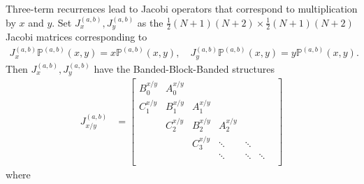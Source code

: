 \documentclass[11pt, oneside]{article}   	%
\newcommand{\half}{\frac{1}{2}}
\newcommand{\bigP}{\mathbb{P}}
\newcommand{\bigPab}{\bigP^{(a,b)}}
\begin{document}
Three-term recurrences lead to Jacobi operators that correspond to multiplication by $x$ and $y$. Set \(J_x^{(a,b)}, J_y^{(a,b)}\) as the \(\half (N+1)(N+2) \times \half (N+1)(N+2)\) Jacobi matrices corresponding to
\begin{align}
J_x^{(a,b)} \bigPab(x,y) = x \bigPab(x,y), \quad J_y^{(a,b)} \bigPab(x,y) = y \bigPab(x,y).
\end{align}
Then  \(J_x^{(a,b)}, J_y^{(a,b)}\) have the Banded-Block-Banded structures
\begin{align}
J_{x/y}^{(a,b)} &= \begin{bmatrix}
		B^{x/y}_0 & A^{x/y}_0 & & & & \\
		C^{x/y}_1 & B^{x/y}_1 & A^{x/y}_1 & & & \\
		& C^{x/y}_2 & B^{x/y}_2 & A^{x/y}_2  & & & \\
		& & C^{x/y}_3 & \ddots & \ddots & \\
		& & & \ddots & \ddots & \ddots \\
	\end{bmatrix}
\end{align}
where
\end{document}
